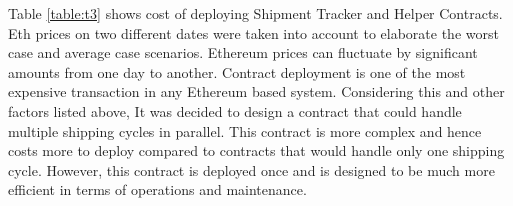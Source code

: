 Table \ref{table:t3} shows cost of deploying Shipment Tracker and Helper Contracts. Eth prices on two different dates were taken into account to elaborate the worst case and average case scenarios. Ethereum prices can fluctuate by significant amounts from one day to another. Contract deployment is one of the most expensive transaction in any Ethereum based system. Considering this and other factors listed above, It was decided to design a contract that could handle multiple shipping cycles in parallel. This contract is more complex and hence costs more to deploy compared to contracts that would handle only one shipping cycle. However, this contract is deployed once and is designed to be much more efficient in terms of operations and maintenance.
\vspace{1mm}
\begin{table}[h]
\centering
{}
\end{table}
